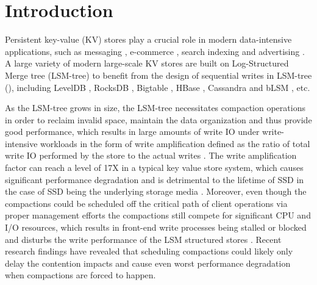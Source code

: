 \documentclass[sigconf]{acmart}
\begin{document}
\section{Introduction}
Persistent key-value (KV) stores play a crucial role in modern data-intensive applications, such as messaging \cite{HH,HBase}, e-commerce \cite{Dynamo}, search indexing \cite{LevelDB, Bigtable} and advertising \cite{RocksDB,PNUTS}. A large variety of modern large-scale KV stores are built on Log-Structured Merge tree (LSM-tree) \cite{LSMtree} to benefit from the design of sequential writes in LSM-tree ({\color{red}{LSM structured stores}}), including LevelDB \cite{LevelDB}, RocksDB \cite{RocksDB}, Bigtable \cite{Bigtable}, HBase \cite{HBase}, Cassandra \cite{Cassandra} and bLSM \cite{bLSM}, etc.

As the LSM-tree grows in size, the LSM-tree necessitates compaction operations in order to reclaim invalid space, maintain the data organization and thus provide good performance, which results in large amounts of write IO under write-intensive workloads \cite{LevelDB, HyperLevelDB, RocksDB} in the form of write amplification defined as the ratio of total write IO performed by the store to the actual writes \cite{LevelDB, PebblesDB}. The write amplification factor can reach a level of 17X \cite{Wisckey,PebblesDB} in a typical key value store system, which causes significant performance degradation and is detrimental to the lifetime of SSD in the case of SSD being the underlying storage media \cite{SSD, Wisckey, HashKV}. Moreover, even though the compactions could be scheduled off the critical path of client operations via proper management efforts \cite{SLMDB,SILK,KVell} the compactions still compete for significant CPU and I/O resources, which results in front-end write processes being stalled or blocked and disturbs the write performance of the LSM structured stores \cite{TRIAD, PebblesDB}. Recent research findings \cite{SILK} have revealed that scheduling compactions could likely only delay the contention impacts and cause even worst performance degradation when compactions are forced to happen. 
\end{document}
